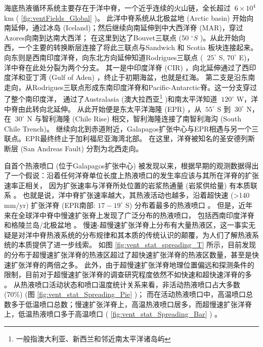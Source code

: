 海底热液循环系统主要存在于洋中脊，一个近乎连续的火山链，全长超过  $ ~6\times 10^4 $  km ( \ref{fig:ventFields_Global} )。
此洋中脊系统从北极盆地 (Arctic basin) 开始向南延伸，通过冰岛 (Iceland)；然后继续向南延伸到中大西洋脊 (MAR)，穿过Azores向南到达南大西洋；
在这里到达了Bouvet三联点 (50 $ ^{\circ}  S $ )。从此开始向西，一个主要的转换断层连接了将此三联点与Sandwich 和 Scotia 板块连接起来。
向东则是西南印度洋脊，向东北方向延伸知道Rodrigues三联点 ( $ ~ 25^{\circ}  $  S,  $ 70^{\circ}  $  E)，洋中脊在此处分裂为两个分支。
其一是中印度洋脊 (CIR) ，向北延伸通过了西印度洋和亚丁湾 (Gulf of Aden) ，终止于初期海盆，也就是红海。
第二支是沿东南走向，从Rodrigues三联点形成东南印度洋脊和Pacific-Antarctic脊。这一分支穿过了整个南印度洋，
通过了Australasia (澳大拉西亚\footnote{一般指澳大利亚、新西兰和邻近南太平洋诸岛屿} )和南太平洋知道  $ ~ 120 ^{\circ}   $ W，洋中脊由此转向北延伸。
从此开始便是东太平洋海隆 (EPR) ，从  $ ~ 55 ^{\circ}   $ S 到  $ ~ 30^{\circ}   $ N，
在  $ ~ 30^{\circ}   $ N 与智利海隆 (Chile Rise) 相交，智利海隆连接了南智利海沟 (South Chile Trench)。
继续向北到赤道附近，Galapagos扩张中心与EPR相遇与另一个三联点。EPR最终终止于加利福尼亚海湾北部。
在这里，洋脊被知名的圣安德列斯断层 (San Andreas Fault) 分割为北西走向。

自首个热液喷口 (位于Galapagos扩张中心) 被发现以来，根据早期的观测数据得出了一个假说：沿着任何洋脊单位长度上热液喷口的发生率应该与其所在洋脊的扩张速率正相关，
因为扩张速率与洋脊所处位置的岩浆热通量 (岩浆供给量) 有本质联系 \citep{baker1996relationship} 。
也就是说，洋中脊扩张速率越大，其热液活动也越多，沿着超快速 (>140 mm/yr) 扩张洋脊 (EPR南部:  $ 17 - 19^{\circ}   $ S) 分布着最多的热液喷口 \citep{feely1996hydrothermal,ishibashi1997hydrothermal} 。
但是，近年来在全球洋中脊中慢速扩张脊上发现了广泛分布的热液喷口，
包括西南印度洋脊  \citep{tao2012first,german1998hydrothermal,bach2002discovery}   和格陵兰岛/北极盆地 \citep{edmonds2003discovery}  。
慢速-超慢速扩张洋脊上分布有大量热液区，这一事实无疑是对洋中脊热液系统的分布规律和其本质的传统认识的颠覆，为人们了解热液系统的本质提供了进一步线索。
如图 \ref{fig:vent_stat_spreading_T} 所示，目前发现的分布于超慢速扩张洋脊的热液区超过了超快速扩张洋脊的热液区数量，甚至是快速扩张洋脊的两倍之多。
此外，由于超慢速扩张洋脊地理位置偏远和探测条件的限制，目前对于超慢速扩张洋脊的调查研究程度依然不如快速和超快速洋脊的多 \cite{german2006hydrothermal} 。
从热液喷口活动状态和喷口温度统计关系来看，非活动热液喷口占大多数 (70\%) (图 \ref{fig:vent_stat_Spreading_Pie} )；
而在活动热液喷口中，高温喷口总数多于低温喷口总数；慢速扩张洋脊上，高温热液喷口居多，而超慢速扩张洋脊上，低温热液喷口多于高温喷口 ( \ref{fig:vent_stat_Spreading_Bar} ) 。

